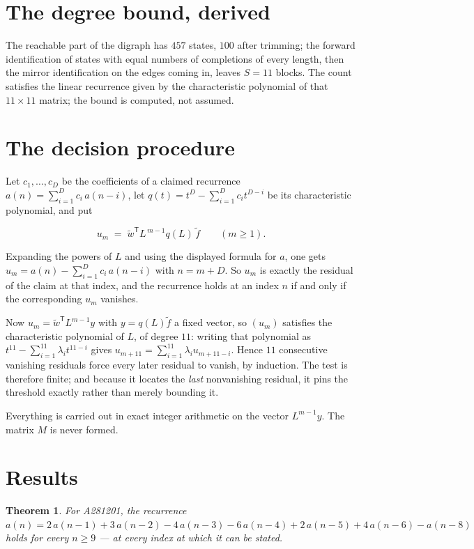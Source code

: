 \documentclass[11pt]{article}
\newtheorem{theorem}{Theorem}
\theoremstyle{definition}
\begin{document}
\section{The degree bound, derived}

The reachable part of the digraph has $457$ states, $100$ after trimming; the forward identification of states with equal numbers of completions of every length, then the mirror identification on the edges coming in, leaves $S = 11$ blocks. The count satisfies the linear recurrence given by the characteristic polynomial of that $11\times11$ matrix; the bound is computed, not assumed.

\section{The decision procedure}

Let $c_1,\dots,c_D$ be the coefficients of a claimed recurrence $a(n) = \sum_{i=1}^{D} c_i\,a(n-i)$, let $q(t) = t^{D} - \sum_{i=1}^{D} c_i t^{D-i}$ be its characteristic polynomial, and put

\[u_m \;=\; \tilde w^{\mathsf T} L^{\,m-1} q(L)\,\tilde f \qquad (m \ge 1).\]

Expanding the powers of $L$ and using the displayed formula for $a$, one gets $u_m = a(n) - \sum_{i=1}^{D} c_i\,a(n-i)$ with $n = m + D$. So $u_m$ is exactly the residual of the claim at that index, and the recurrence holds at an index $n$ if and only if the corresponding $u_m$ vanishes.

Now $u_m = \tilde w^{\mathsf T} L^{m-1} y$ with $y = q(L)\tilde f$ a fixed vector, so $(u_m)$ satisfies the characteristic polynomial of $L$, of degree $11$: writing that polynomial as $t^{11} - \sum_{i=1}^{11} \lambda_i t^{11-i}$ gives $u_{m+11} = \sum_{i=1}^{11} \lambda_i u_{m+11-i}$. Hence $11$ consecutive vanishing residuals force every later residual to vanish, by induction. The test is therefore finite; and because it locates the {\itshape last} nonvanishing residual, it pins the threshold exactly rather than merely bounding it.

Everything is carried out in exact integer arithmetic on the vector $L^{m-1}y$. The matrix $M$ is never formed.

\section{Results}

\begin{theorem} For A281201, the recurrence $a(n) = 2\,a(n-1) + 3\,a(n-2) - 4\,a(n-3) - 6\,a(n-4) + 2\,a(n-5) + 4\,a(n-6) - a(n-8)$ holds for every $n \ge 9$ --- at every index at which it can be stated.\end{theorem}
\end{document}
